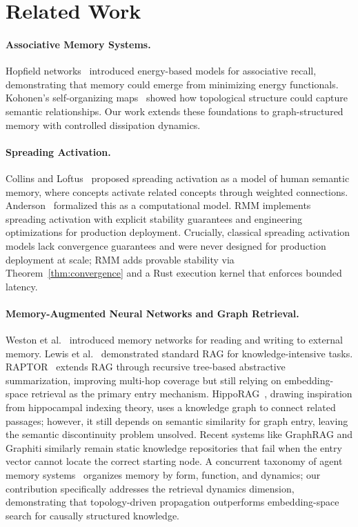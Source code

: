 \documentclass[11pt]{article}
\begin{document}
\section{Related Work}

\paragraph{Associative Memory Systems.}
Hopfield networks~\cite{hopfield1982} introduced energy-based models for
associative recall, demonstrating that memory could emerge from
minimizing energy functionals. Kohonen's self-organizing
maps~\cite{kohonen1972} showed how topological structure could capture
semantic relationships. Our work extends these foundations to
graph-structured memory with controlled dissipation dynamics.

\paragraph{Spreading Activation.}
Collins and Loftus~\cite{collins1975} proposed spreading activation as a
model of human semantic memory, where concepts activate related concepts
through weighted connections. Anderson~\cite{anderson1983} formalized
this as a computational model. RMM implements spreading activation with
explicit stability guarantees and engineering optimizations for
production deployment. Crucially, classical spreading activation models
lack convergence guarantees and were never designed for production
deployment at scale; RMM adds provable stability via Theorem~\ref{thm:convergence}
and a Rust execution kernel that enforces bounded latency.

\paragraph{Memory-Augmented Neural Networks and Graph Retrieval.}
Weston et al.~\cite{weston2015} introduced memory networks for reading
and writing to external memory. Lewis et al.~\cite{lewis2020rag}
demonstrated standard RAG for knowledge-intensive tasks. RAPTOR~\cite{sarthi2024raptor}
extends RAG through recursive tree-based abstractive summarization,
improving multi-hop coverage but still relying on embedding-space
retrieval as the primary entry mechanism. HippoRAG~\cite{gutierrez2024hipporag},
drawing inspiration from hippocampal indexing theory, uses a knowledge
graph to connect related passages; however, it still depends on semantic
similarity for graph entry, leaving the semantic discontinuity problem
unsolved. Recent systems like GraphRAG and Graphiti similarly remain
static knowledge repositories that fail when the entry vector cannot
locate the correct starting node. A concurrent taxonomy of agent memory
systems~\cite{hu2025memory} organizes memory by form, function, and
dynamics; our contribution specifically addresses the retrieval dynamics
dimension, demonstrating that topology-driven propagation outperforms
embedding-space search for causally structured knowledge.
\end{document}
